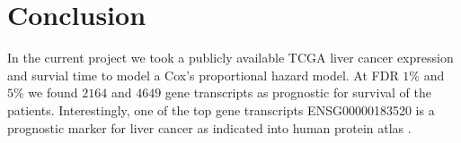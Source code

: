\documentclass[9pt,twocolumn,twoside]{article}
\begin{document}
\section{Conclusion}
In the current project we took a publicly available TCGA liver cancer expression and survial time to model a Cox's proportional hazard model. At FDR $1\%$ and $5\%$ we found $2164$ and $4649$ gene transcripts as prognostic for survival of the patients. Interestingly,  one of the top gene transcripts ENSG00000183520 is a prognostic  marker  for liver cancer as indicated into human protein atlas \cite{uhlen2015tissue}.

\newpage


\end{document}
